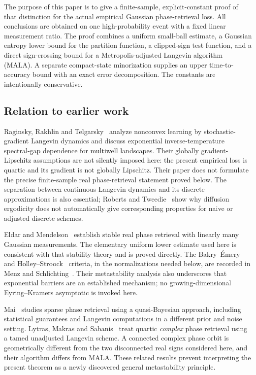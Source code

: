 \documentclass[11pt,letterpaper]{article}
\numberwithin{equation}{section}
\theoremstyle{remark}
\newcommand{\1}{\mathbf 1}
\begin{document}
The purpose of this paper is to give a finite-sample, explicit-constant proof of that distinction for the actual empirical Gaussian phase-retrieval loss. All conclusions are obtained on one high-probability event with a fixed linear measurement ratio. The proof combines a uniform small-ball estimate, a Gaussian entropy lower bound for the partition function, a clipped-sign test function, and a direct sign-crossing bound for a Metropolis-adjusted Langevin algorithm (MALA). A separate compact-state minorization supplies an upper time-to-accuracy bound with an exact error decomposition. The constants are intentionally conservative.

\subsection{Relation to earlier work}

Raginsky, Rakhlin and Telgarsky~\cite{RRT} analyze nonconvex learning by stochastic-gradient Langevin dynamics and discuss exponential inverse-temperature spectral-gap dependence for multiwell landscapes. Their globally gradient-Lipschitz assumptions are not silently imposed here: the present empirical loss is quartic and its gradient is not globally Lipschitz. Their paper does not formulate the precise finite-sample real phase-retrieval statement proved below. The separation between continuous Langevin dynamics and its discrete approximations is also essential; Roberts and Tweedie~\cite{RT} show why diffusion ergodicity does not automatically give corresponding properties for naive or adjusted discrete schemes.

Eldar and Mendelson~\cite{EM} establish stable real phase retrieval with linearly many Gaussian measurements. The elementary uniform lower estimate used here is consistent with that stability theory and is proved directly. The Bakry--\'Emery~\cite{BE} and Holley--Stroock~\cite{HS} criteria, in the normalizations needed below, are recorded in Menz and Schlichting~\cite[Theorems 3.1--3.2]{MS}. Their metastability analysis also underscores that exponential barriers are an established mechanism; no growing-dimensional Eyring--Kramers asymptotic is invoked here.

Mai~\cite{Mai} studies sparse phase retrieval using a quasi-Bayesian approach, including statistical guarantees and Langevin computations in a different prior and noise setting. Lytras, Makras and Sabanis~\cite[Section 8.2]{LMS} treat quartic \emph{complex} phase retrieval using a tamed unadjusted Langevin scheme. A connected complex phase orbit is geometrically different from the two disconnected real signs considered here, and their algorithm differs from MALA. These related results prevent interpreting the present theorem as a newly discovered general metastability principle.
\end{document}
